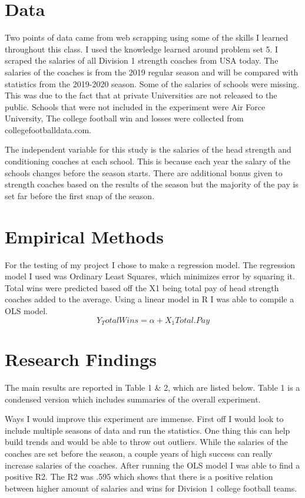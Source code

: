 \documentclass[12pt,english]{article}
\begin{document}
\section{Data}\label{sec:data}
Two points of data came from web scrapping using some of the skills I learned throughout this class. I used the knowledge learned around problem set 5. I scraped the salaries of all Division 1 strength coaches from USA today.  The salaries of the coaches is from the 2019 regular season and will be compared with statistics from the 2019-2020 season. Some of the salaries of schools were missing. This was due to the fact that at private Universities are not released to the public. Schools that were not included in the experiment were Air Force University, The college football win and losses were collected from collegefootballdata.com.

The independent variable for this study is the salaries of the head strength and conditioning coaches at each school. This is because each year the salary of the schools changes before the season starts. There are additional bonus given to strength coaches based on the results of the season but the majority of the pay is set far before the first snap of the season. 




\section{Empirical Methods}\label{sec:methods}
For the testing of my project I chose to make a regression model. The regression model I used was Ordinary Least Squares, which minimizes error by squaring it. Total wins were predicted based off the X1 being total pay of head strength coaches added to the average. Using a linear model in R I was able to compile a OLS model. 
\begin{equation}
\label{eq:1}
Y_ Total Wins = \alpha+ X_{1}{Total.Pay}
\end{equation}




\section{Research Findings}\label{sec:results}
The main results are reported in Table 1 & 2, which are listed below. Table 1 is a condensed version which includes summaries of the overall experiment.

Ways I would improve this experiment are immense. First off I would look to include multiple seasons of data and run the statistics. One thing this can help build trends and would be able to throw out outliers. While the salaries of the coaches are set before the season, a couple years of high success can really increase salaries of the coaches. After running the OLS model I was able to find a positive R2. The R2 was .595 which shows that there is a positive relation between higher amount of salaries and wins for Division 1 college football teams. 
\end{document}
